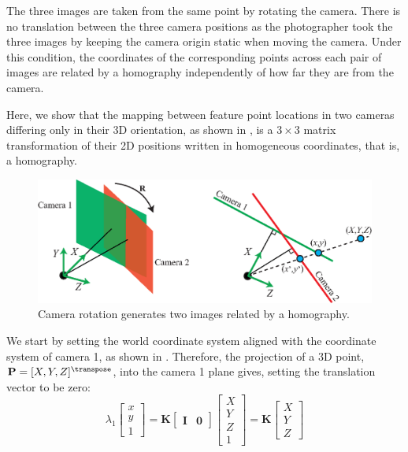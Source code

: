 The three images are taken from the same point by rotating the camera. There is no translation between the three camera positions as the photographer took the three images by keeping the camera origin static when moving the camera. Under this condition, the coordinates of the corresponding points across each pair of images are related by a homography independently of how far they are from the camera.  

Here, we show that the mapping between feature point locations in two cameras differing only in their 3D orientation, as shown in \fig{\ref{fig:rotation_homography}}, is a $3\times3$ matrix transformation of their 2D positions written in homogeneous coordinates, that is, a homography. 


\begin{figure}[h!]
\centerline{
\includegraphics[width=1\linewidth]{figures/homography/rotation_homography_vs3.eps}
}
\caption{Camera rotation generates two images related by a homography.}
\label{fig:rotation_homography}
\end{figure}

We start by setting the world coordinate system aligned with the coordinate system of camera 1, as shown in \fig{\ref{fig:rotation_homography}}.  Therefore, the projection of a 3D point, $\mathbf{P}=[X,Y,Z]^\transpose$, into the camera 1 plane gives, setting the translation vector to be zero:
\begin{equation}
 \lambda_1 
    \begin{bmatrix}
    x \\
    y \\
    1
    \end{bmatrix}
    =
    \mathbf{K}  
    \begin{bmatrix}
    \mathbf{I} & \mathbf{0} 
    \end{bmatrix}
    \begin{bmatrix}
    X \\
    Y \\
    Z \\
    1
    \end{bmatrix} 
    = 
    \mathbf{K} 
    \begin{bmatrix}
    X \\
    Y \\
    Z 
    \end{bmatrix} 
    \label{eq:projectionintofirstcamera}
\end{equation}

